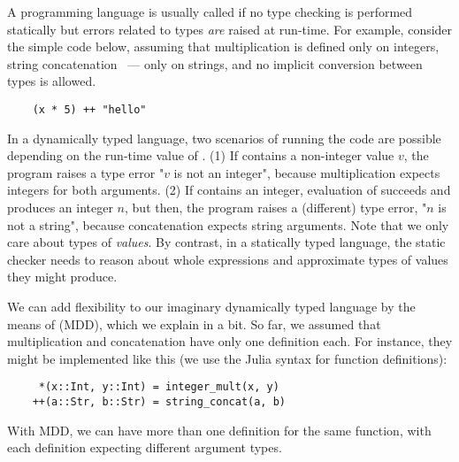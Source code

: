 A programming language is usually called 
if no type checking is performed statically
but errors related to types \emph{are} raised at run-time.
For example, consider the simple code below, assuming that
multiplication \jlcode{(*)} is defined only on integers, 
string concatenation \jlcode{(++)}~--- only on strings,
and no implicit conversion between types is allowed.
\begin{verbatim}
    (x * 5) ++ "hello"
\end{verbatim}
In a dynamically typed language, two scenarios of running the code are possible
depending on the run-time value of .
(1) If  contains a non-integer value $v$, 
the program raises a type error "$v$ is not an integer",
because multiplication expects integers for both arguments.
(2) If  contains an integer,
evaluation of  succeeds and produces an integer $n$,
but then, the program raises a (different) type error, "$n$ is not a string", 
because concatenation expects string arguments.
Note that we only care about %
types of \emph{values}. By contrast, in a statically typed language,
the static checker needs to reason about whole expressions and approximate
types of values they might produce.

We can add flexibility to our imaginary dynamically typed language
by the means of  (MDD), 
which we explain in a bit.
So far, we assumed that multiplication and concatenation have only one 
definition each. For instance, they might be implemented like this 
(we use the Julia syntax for function definitions):
\begin{verbatim}
     *(x::Int, y::Int) = integer_mult(x, y)
    ++(a::Str, b::Str) = string_concat(a, b)
\end{verbatim}

With MDD, we can have more than one definition for the same function, 
with each definition expecting different argument types.


